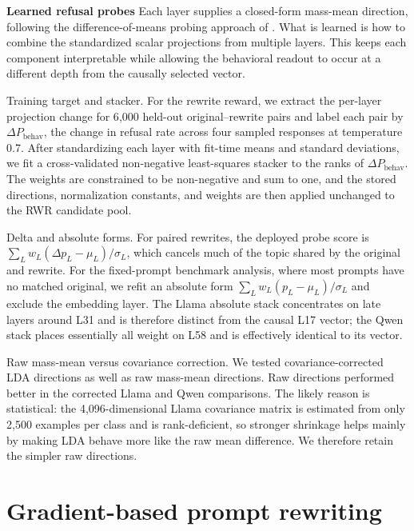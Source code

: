 \documentclass{article}
\begin{document}
\textbf{Learned refusal probes}
    Each layer supplies a closed-form mass-mean direction, following the difference-of-means probing approach of \citet{marks2024geometry}. What is learned is how to combine the standardized scalar projections from multiple layers. This keeps each component interpretable while allowing the behavioral readout to occur at a different depth from the causally selected vector.

  Training target and stacker. For the rewrite reward, we extract the per-layer projection change for 6{,}000 held-out original--rewrite pairs and label each pair by \(\Delta P_{\mathrm{behav}}\), the change in refusal rate across four sampled responses at temperature 0.7. After standardizing each layer with fit-time means and standard deviations, we fit a cross-validated non-negative least-squares stacker to the ranks of \(\Delta P_{\mathrm{behav}}\). The weights are constrained to be non-negative and sum to one, and the stored directions, normalization constants, and weights are then applied unchanged to the RWR candidate pool.

  Delta and absolute forms. For paired rewrites, the deployed probe score is \(\sum_L w_L(\Delta p_L-\mu_L)/\sigma_L\), which cancels much of the topic shared by the original and rewrite. For the fixed-prompt benchmark analysis, where most prompts have no matched original, we refit an absolute form \(\sum_L w_L(p_L-\mu_L)/\sigma_L\) and exclude the embedding layer. The Llama absolute stack concentrates on late layers around L31 and is therefore distinct from the causal L17 vector; the Qwen stack places essentially all weight on L58 and is effectively identical to its vector.

  Raw mass-mean versus covariance correction. We tested covariance-corrected LDA directions as well as raw mass-mean directions. Raw directions performed better in the corrected Llama and Qwen comparisons. The likely reason is statistical: the 4{,}096-dimensional Llama covariance matrix is estimated from only 2{,}500 examples per class and is rank-deficient, so stronger shrinkage helps mainly by making LDA behave more like the raw mean difference. We therefore retain the simpler raw directions.

\section{Gradient-based prompt rewriting}
\end{document}
